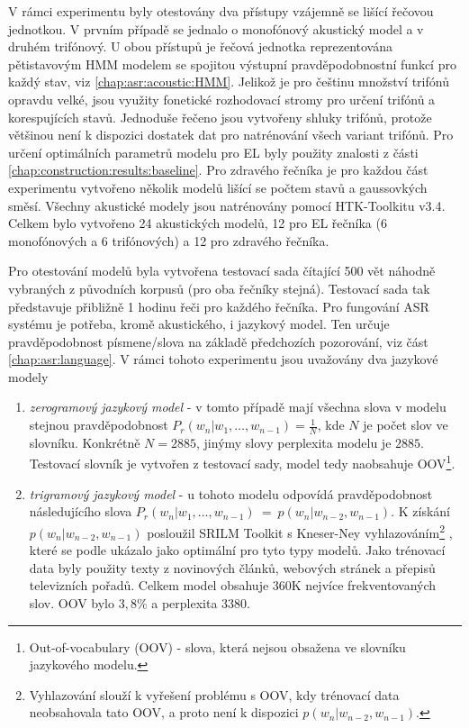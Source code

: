 V rámci experimentu byly otestovány dva přístupy vzájemně se lišící řečovou jednotkou. V prvním případě se jednalo o monofónový akustický model a v druhém trifónový. U obou přístupů je řečová jednotka reprezentována pětistavovým HMM modelem se spojitou výstupní pravděpodobnostní funkcí pro každý stav, viz \ref{chap:asr:acoustic:HMM}. Jelikož je pro češtinu množství trifónů opravdu velké, jsou využity fonetické rozhodovací stromy pro určení trifónů a korespujících stavů. Jednoduše řečeno jsou vytvořeny shluky trifónů, protože většinou není k dispozici dostatek dat pro natrénování všech variant trifónů. Pro určení optimálních parametrů modelu pro EL byly použity znalosti z části \ref{chap:construction:results:baseline}. Pro zdravého řečníka je pro každou část experimentu vytvořeno několik modelů lišící se počtem stavů a gaussovkých směsí. Všechny akustické modely jsou natrénovány pomocí HTK-Toolkitu v3.4. Celkem bylo vytvořeno 24 akustických modelů, 12 pro EL řečníka (6 monofónových a 6 trifónových) a 12 pro zdravého řečníka.

Pro otestování modelů byla vytvořena testovací sada čítající 500 vět náhodně vybraných z původních korpusů (pro oba řečníky stejná). Testovací sada tak představuje přibližně 1 hodinu řeči pro každého řečníka. Pro fungování ASR systému je potřeba, kromě akustického, i jazykový model. Ten určuje pravděpodobnost písmene/slova na základě předchozích pozorování, viz část \ref{chap:asr:language}. V rámci tohoto experimentu jsou uvažovány dva jazykové modely

\begin{enumerate}
  \item \textit{zerogramový jazykový model} - v tomto případě mají všechna slova v modelu stejnou pravděpodobnost $P_r(w_n|w_1,\dots,w_{n-1}) = \frac{1}{N}$, kde $N$ je počet slov ve slovníku. Konkrétně $N = 2885$, jinýmy slovy perplexita modelu je $2885$. Testovací slovník je vytvořen z testovací sady, model tedy naobsahuje OOV\footnote{Out-of-vocabulary (OOV) - slova, která nejsou obsažena ve slovníku jazykového modelu.}.
  \item \textit{trigramový jazykový model} - u tohoto modelu odpovídá pravděpodobnost následujícího slova $P_r(w_n|w_1,\dots,w_{n-1})~=~p(w_n|w_{n-2}, w_{n-1})$. K získání $p(w_n|w_{n-2}, w_{n-1})$ posloužil SRILM Toolkit s Kneser-Ney vyhlazováním\footnote{Vyhlazování slouží k vyřešení problému s OOV, kdy trénovací data neobsahovala tato OOV, a proto není k dispozici $p(w_n|w_{n-2}, w_{n-1})$.} \cite{Stolcke2002}, které se podle \cite{Prazak2008} ukázalo jako optimální pro tyto typy modelů. Jako trénovací data byly použity texty z novinových článků, webových stránek a přepisů televizních pořadů. Celkem model obsahuje 360K nejvíce frekventovaných slov. OOV bylo $3,8 \%$ a perplexita $3380$.
\end{enumerate}

